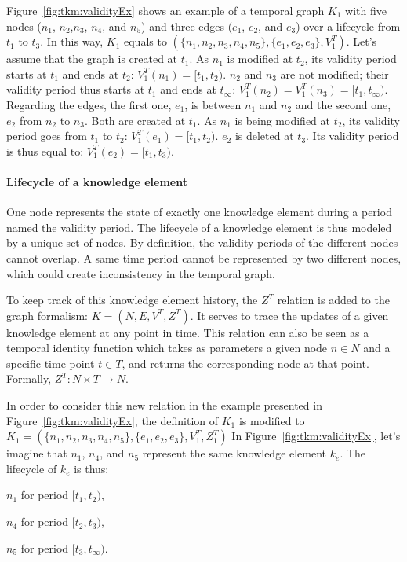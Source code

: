 Figure~\ref{fig:tkm:validityEx} shows an example of a temporal graph $K_1$ with five nodes ($n_1$, $n_2$,$n_3$, $n_4$, and $n_5$) and three edges ($e_1$, $e_2$, and  $e_3$) over a lifecycle from $t_1$ to $t_3$.
In this way, $K_1$ equals to $(\{n_1, n_2, n_3, n_4, n_5\}, \{e_1, e_2, e_3\}, V^{T}_1)$.
Let's assume that the graph is created at $t_1$.
As $n_1$ is modified at $t_2$, its validity period starts at $t_1$ and ends at $t_2$: $V^{T}_1(n_1) = [t_1, t_2)$.
$n_2$ and $n_3$ are not modified; their validity period thus starts at $t_1$ and ends at $t_\infty$: $V^{T}_1(n_2) = V^{T}_1(n_3) = [t_1, t_\infty)$.
Regarding the edges, the first one, $e_1$, is between $n_1$ and $n_2$ and the second one, $e_2$ from $n_2$ to $n_3$.
Both are created at $t_1$.
As $n_1$ is being modified at $t_2$, its validity period goes from $t_1$ to $t_2$:  $V^{T}_1(e_1) = [t_1, t_2)$.
$e_2$ is deleted at $t_3$.
Its validity period is thus equal to: $V^{T}_1(e_2) = [t_1, t_3)$.

\paragraph{Lifecycle of a knowledge element}
One node represents the state of exactly one knowledge element during a period named the validity period.
The lifecycle of a knowledge element is thus modeled by a unique set of nodes.
By definition, the validity periods of the different nodes cannot overlap.
A same time period cannot be represented by two different nodes, which could create inconsistency in the temporal graph.

To keep track of this knowledge element history, the $Z^T$ relation is added to the graph formalism: $K = (N, E, V^T, Z^T)$.
It serves to trace the updates of a given knowledge element at any point in time. 
This relation can also be seen as a temporal identity function which takes as parameters a given node $n \in N$ and a specific time point $t \in T$, and returns the corresponding node at that point. 
Formally, $Z^T: N \times T \rightarrow N$. 

In order to consider this new relation in the example presented in Figure~\ref{fig:tkm:validityEx}, the definition of $K_1$ is modified to $K_1 = (\{n_1, n_2, n_3, n_4, n_5\}, \{e_1, e_2, e_3\}, V^{T}_1, Z^{T}_1)$
In Figure~\ref{fig:tkm:validityEx}, let's imagine that $n_1$, $n_4$, and $n_5$ represent the same knowledge element $k_e$.
The lifecycle of $k_e$ is thus:
\begin{condItemize}
	\item $n_1$ for period $[t_1, t_2)$,
	\item $n_4$ for period $[t_2, t_3)$,
	\item $n_5$ for period $[t_3, t_\infty)$.
\end{condItemize}

